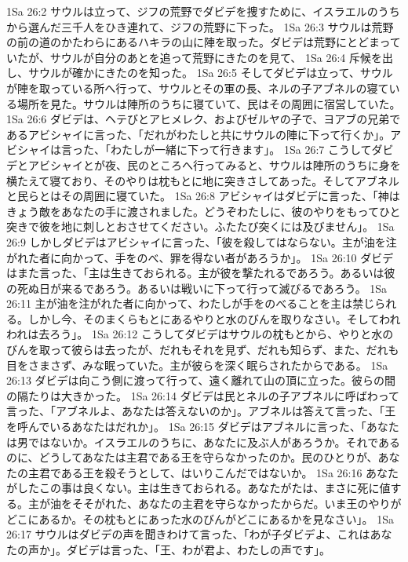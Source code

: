 1Sa 26:2  サウルは立って、ジフの荒野でダビデを捜すために、イスラエルのうちから選んだ三千人をひき連れて、ジフの荒野に下った。
1Sa 26:3  サウルは荒野の前の道のかたわらにあるハキラの山に陣を取った。ダビデは荒野にとどまっていたが、サウルが自分のあとを追って荒野にきたのを見て、
1Sa 26:4  斥候を出し、サウルが確かにきたのを知った。
1Sa 26:5  そしてダビデは立って、サウルが陣を取っている所へ行って、サウルとその軍の長、ネルの子アブネルの寝ている場所を見た。サウルは陣所のうちに寝ていて、民はその周囲に宿営していた。
1Sa 26:6  ダビデは、ヘテびとアヒメレク、およびゼルヤの子で、ヨアブの兄弟であるアビシャイに言った、「だれがわたしと共にサウルの陣に下って行くか」。アビシャイは言った、「わたしが一緒に下って行きます」。
1Sa 26:7  こうしてダビデとアビシャイとが夜、民のところへ行ってみると、サウルは陣所のうちに身を横たえて寝ており、そのやりは枕もとに地に突きさしてあった。そしてアブネルと民らとはその周囲に寝ていた。
1Sa 26:8  アビシャイはダビデに言った、「神はきょう敵をあなたの手に渡されました。どうぞわたしに、彼のやりをもってひと突きで彼を地に刺しとおさせてください。ふたたび突くには及びません」。
1Sa 26:9  しかしダビデはアビシャイに言った、「彼を殺してはならない。主が油を注がれた者に向かって、手をのべ、罪を得ない者があろうか」。
1Sa 26:10  ダビデはまた言った、「主は生きておられる。主が彼を撃たれるであろう。あるいは彼の死ぬ日が来るであろう。あるいは戦いに下って行って滅びるであろう。
1Sa 26:11  主が油を注がれた者に向かって、わたしが手をのべることを主は禁じられる。しかし今、そのまくらもとにあるやりと水のびんを取りなさい。そしてわれわれは去ろう」。
1Sa 26:12  こうしてダビデはサウルの枕もとから、やりと水のびんを取って彼らは去ったが、だれもそれを見ず、だれも知らず、また、だれも目をさまさず、みな眠っていた。主が彼らを深く眠らされたからである。
1Sa 26:13  ダビデは向こう側に渡って行って、遠く離れて山の頂に立った。彼らの間の隔たりは大きかった。
1Sa 26:14  ダビデは民とネルの子アブネルに呼ばわって言った、「アブネルよ、あなたは答えないのか」。アブネルは答えて言った、「王を呼んでいるあなたはだれか」。
1Sa 26:15  ダビデはアブネルに言った、「あなたは男ではないか。イスラエルのうちに、あなたに及ぶ人があろうか。それであるのに、どうしてあなたは主君である王を守らなかったのか。民のひとりが、あなたの主君である王を殺そうとして、はいりこんだではないか。
1Sa 26:16  あなたがしたこの事は良くない。主は生きておられる。あなたがたは、まさに死に値する。主が油をそそがれた、あなたの主君を守らなかったからだ。いま王のやりがどこにあるか。その枕もとにあった水のびんがどこにあるかを見なさい」。
1Sa 26:17  サウルはダビデの声を聞きわけて言った、「わが子ダビデよ、これはあなたの声か」。ダビデは言った、「王、わが君よ、わたしの声です」。
